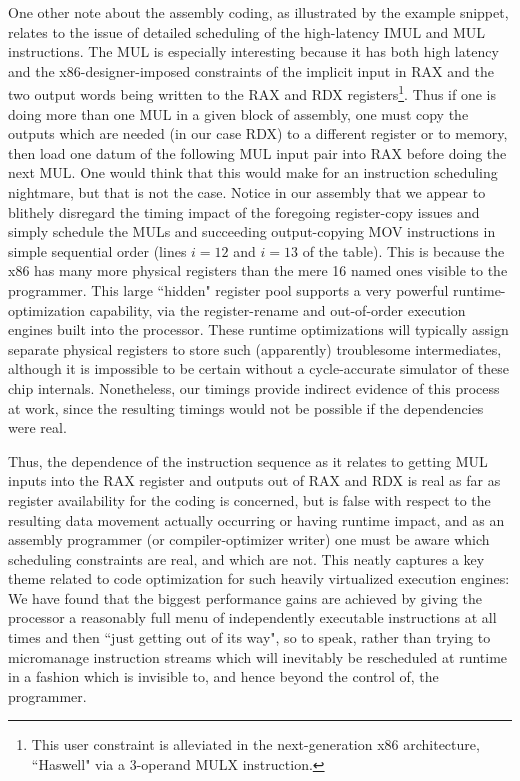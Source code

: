 \documentclass{article}
\begin{document}
One other note about the assembly coding, as illustrated by the example snippet, relates to the issue of detailed scheduling of the high-latency IMUL and MUL instructions. The MUL is especially interesting because it has both high latency and the x86-designer-imposed constraints of the implicit input in RAX and the two output words being written to the RAX and RDX registers\footnote{This user constraint is alleviated in the next-generation x86 architecture, ``Haswell" via a 3-operand MULX instruction.}. Thus if one is doing more than one MUL in a given block of assembly, one must copy the outputs which are needed (in our case RDX) to a different register or to memory, then load one datum of the following MUL input pair into RAX before doing the next MUL. One would think that this would make for an instruction scheduling nightmare, but that is not the case. Notice in our assembly that we appear to blithely disregard the timing impact of the foregoing register-copy issues and simply schedule the MULs and succeeding output-copying MOV instructions in simple sequential order (lines $i=12$ and $i=13$ of the table). This is because the x86 has many more physical registers than the mere 16 named ones visible to the programmer. This large ``hidden" register pool supports a very powerful runtime-optimization capability, via the register-rename and out-of-order execution engines built into the processor. These runtime optimizations will typically assign separate physical registers to store such (apparently) troublesome intermediates, although it is impossible to be certain without a cycle-accurate simulator of these chip internals. Nonetheless, our timings provide indirect evidence of this process at work, since the resulting timings would not be possible if the dependencies were real.

Thus, the dependence of the instruction sequence as it relates to getting MUL inputs into the RAX register and outputs out of RAX and RDX is real as far as register availability for the coding is concerned, but is false with respect to the resulting data movement actually occurring or having runtime impact, and as an assembly programmer (or compiler-optimizer writer) one must be aware which scheduling constraints are real, and which are not. This neatly captures a key theme related to code optimization for such heavily virtualized execution engines: We have found that the biggest performance gains are achieved by giving the processor a reasonably full menu of independently executable instructions at all times and then ``just getting out of its way", so to speak, rather than trying to micromanage instruction streams which will inevitably be rescheduled at runtime in a fashion which is invisible to, and hence beyond the control of, the programmer.
\end{document}
